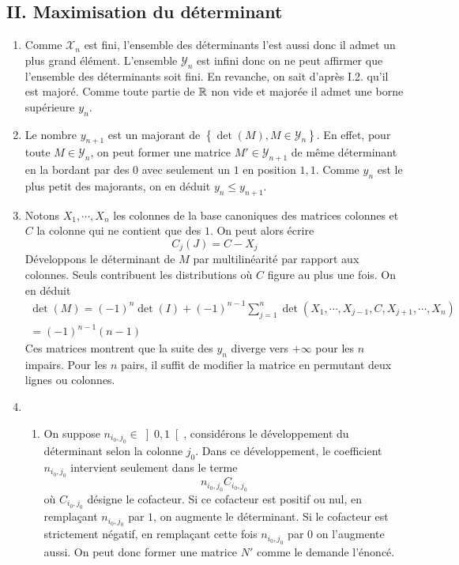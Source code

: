 \subsection*{II. Maximisation du déterminant}
\begin{enumerate}
  \item Comme $\mathcal{X}_n$ est fini, l'ensemble des déterminants l'est aussi donc il admet un plus grand élément.\newline
L'ensemble $\mathcal{Y}_n$ est infini donc on ne peut affirmer que l'ensemble des déterminants soit fini. En revanche, on sait d'après I.2. qu'il est majoré. Comme toute partie de $\mathbb{R}$ non vide et majorée il admet une borne supérieure $y_n$.

  \item Le nombre $y_{n+1}$ est un majorant de $\left\lbrace \det(M), M\in  \mathcal{Y}_n\right\rbrace $. En effet, pour toute $M\in \mathcal{Y}_n$, on peut former une matrice $M'\in \mathcal{Y}_{n+1}$ de même déterminant en la bordant par des $0$ avec seulement un $1$ en position $1,1$. Comme $y_n$ est le plus petit des majorants, on en déduit $y_n\leq y_{n+1}$.
  
  \item Notons $X_1, \cdots, X_n$ les colonnes de la base canoniques des matrices colonnes et $C$ la colonne qui ne contient que des $1$. On peut alors écrire
\begin{displaymath}
  C_j(J) = C - X_j
\end{displaymath}
Développons le déterminant de $M$ par multilinéarité par rapport aux colonnes. Seuls contribuent les distributions où $C$ figure au plus une fois. On en déduit
\begin{multline*}
  \det(M) = (-1)^n\det(I) + (-1)^{n-1}\sum_{j=1}^n\det(X_1,\cdots,X_{j-1},C,X_{j+1},\cdots,X_n)\\
  = (-1)^{n-1}(n-1)
\end{multline*}
Ces matrices montrent que la suite des $y_n$ diverge vers $+\infty$ pour les $n$ impairs. Pour les $n$ pairs, il suffit de modifier la matrice en permutant deux lignes ou colonnes.

  \item
\begin{enumerate}
  \item On suppose $n_{i_0,j_0}\in \left] 0,1\right[$, considérons le développement du déterminant selon la colonne $j_0$. Dans ce développement, le coefficient $n_{i_0,j_0}$ intervient seulement dans le terme
\begin{displaymath}
  n_{i_0,j_0}C_{i_0,j_0}
\end{displaymath}
où $C_{i_0,j_0}$ désigne le cofacteur. Si ce cofacteur est positif ou nul, en remplaçant $n_{i_0,j_0}$ par $1$, on augmente le déterminant. Si le cofacteur est strictement négatif, en remplaçant cette fois $n_{i_0,j_0}$ par $0$ on l'augmente aussi. On peut donc former une matrice $N'$ comme le demande l'énoncé.


\end{enumerate}
\end{enumerate}
